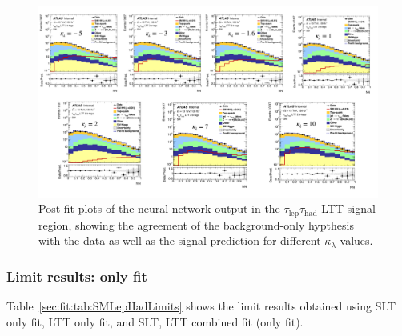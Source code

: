 \begin{figure}[htbp]
\begin{center}
\includegraphics[width=\textwidth]{DiHiggs/plots/kl_scan/bbtautauSubchannels/bkg_only_postfit_lephad_LTT.pdf}
\end{center}
\caption{Post-fit plots of the neural network output in the $\tau_{\text{lep}}\tau_{\text{had}}$ LTT signal region, 
showing the agreement of the background-only hypthesis with the data as well as the signal prediction for different $\kappa_\lambda$ values.}
\label{fig:postfit_ltt}
\end{figure}


\newpage
\subsubsection{Limit results: \lephad only fit}


Table~\ref{sec:fit:tab:SMLepHadLimits} shows 
the limit results obtained using SLT only fit, LTT only fit, and SLT, LTT combined fit (\lephad only fit).


